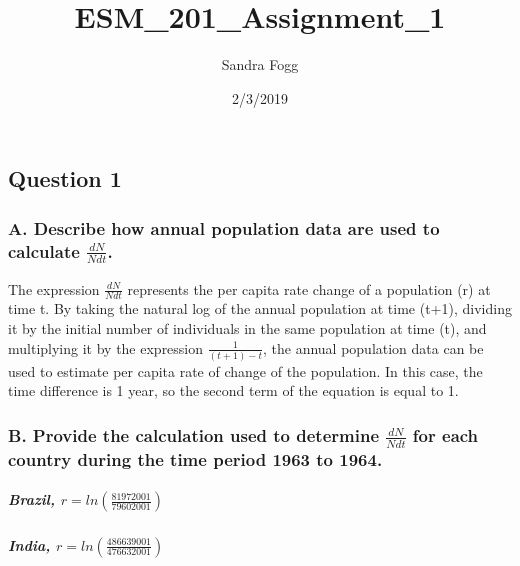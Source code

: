 \documentclass[]{article}
\title{ESM\_201\_Assignment\_1}
\author{Sandra Fogg}
\date{2/3/2019}
\let\oldsubparagraph\subparagraph
\renewcommand{\subparagraph}[1]{\oldsubparagraph{#1}\mbox{}}
\begin{document}
\maketitle

\subsection{Question 1}\label{question-1}

\subsubsection{\texorpdfstring{A. Describe how annual population data
are used to calculate
\(\frac{dN}{Ndt}\).}{A. Describe how annual population data are used to calculate \textbackslash{}frac\{dN\}\{Ndt\}.}}\label{a.-describe-how-annual-population-data-are-used-to-calculate-fracdnndt.}

The expression \(\frac{dN}{Ndt}\) represents the per capita rate change
of a population (r) at time t. By taking the natural log of the annual
population at time (t+1), dividing it by the initial number of
individuals in the same population at time (t), and multiplying it by
the expression \(\frac{1}{(t+1)-t}\), the annual population data can be
used to estimate per capita rate of change of the population. In this
case, the time difference is 1 year, so the second term of the equation
is equal to 1.

\subsubsection{\texorpdfstring{B. Provide the calculation used to
determine \(\frac{dN}{Ndt}\) for each country during the time period
1963 to
1964.}{B. Provide the calculation used to determine \textbackslash{}frac\{dN\}\{Ndt\} for each country during the time period 1963 to 1964.}}\label{b.-provide-the-calculation-used-to-determine-fracdnndt-for-each-country-during-the-time-period-1963-to-1964.}

\subparagraph{\texorpdfstring{Brazil,
\(r= ln\left(\frac{81972001}{79602001}\right)\)}{Brazil, r= ln\textbackslash{}left(\textbackslash{}frac\{81972001\}\{79602001\}\textbackslash{}right)}}\label{brazil-r-lnleftfrac8197200179602001right}

\subparagraph{\texorpdfstring{India,
\(r= ln\left(\frac{486639001}{476632001}\right)\)}{India, r= ln\textbackslash{}left(\textbackslash{}frac\{486639001\}\{476632001\}\textbackslash{}right)}}\label{india-r-lnleftfrac486639001476632001right}
\end{document}
